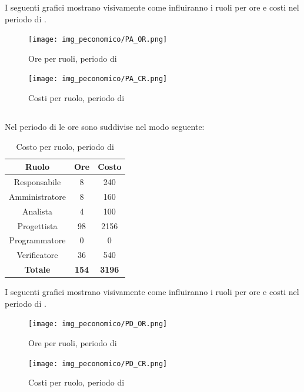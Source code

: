 I seguenti grafici mostrano visivamente come influiranno i ruoli per ore e costi nel periodo di \PA.
\begin{figure}[H]
	\centering
	\texttt{[image: img\_peconomico/PA\_OR.png]}
	\caption{Ore per ruoli, periodo di \PA}
\end{figure}
\begin{figure}[H]
	\centering
	\texttt{[image: img\_peconomico/PA\_CR.png]}
	\caption{Costi per ruolo, periodo di \PA}
\end{figure}

\subsection{\PD}
Nel periodo di \PD{} le ore sono suddivise nel modo seguente:
\begin{table}[H]
	\centering
	\begin{tabular}{|c|c|c|}
		\hline
		\textbf{Ruolo} &
		\textbf{Ore} &
		\textbf{Costo} \\
		\hline
		Responsabile & 8 & 240 \\
		\hline
		Amministratore & 8 & 160 \\
		\hline
		Analista & 4 & 100\\
		\hline
		Progettista & 98 & 2156 \\
		\hline
		Programmatore & 0 & 0 \\
		\hline
		Verificatore & 36 & 540 \\
		\hline
		\textbf{Totale} & \textbf{154} & \textbf{3196} \\
		\hline
	\end{tabular}
	\caption{Costo per ruolo, periodo di \PD}
\end{table}

I seguenti grafici mostrano visivamente come influiranno i ruoli per ore e costi nel periodo di \PD{}.
\begin{figure}[H]
	\centering
	\texttt{[image: img\_peconomico/PD\_OR.png]}
	\caption{Ore per ruoli, periodo di \PD}
\end{figure}
\begin{figure}[H]
	\centering
	\texttt{[image: img\_peconomico/PD\_CR.png]}
	\caption{Costi per ruolo, periodo di \PD}
\end{figure}

